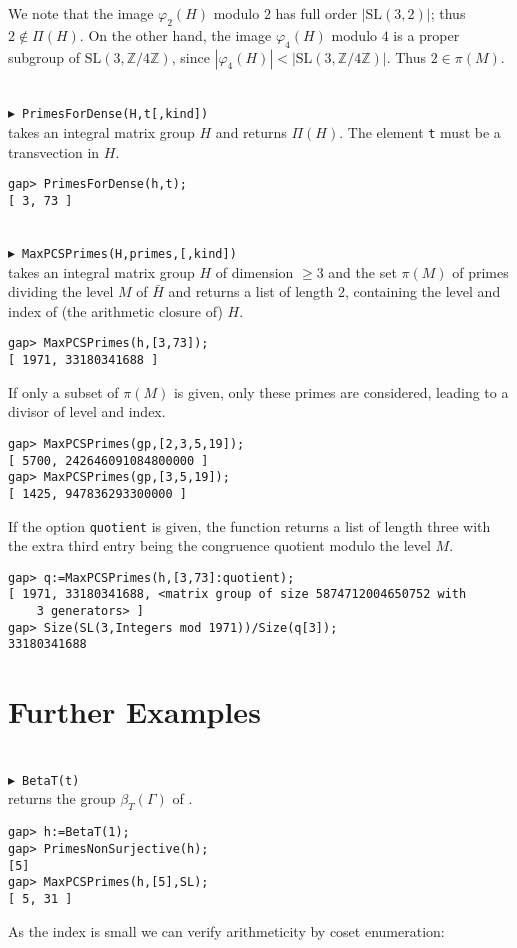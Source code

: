 \documentclass[a4paper,12pt]{amsart}
\newcommand{\Z}{\mathbb{Z}}
\newcommand{\SL}{\mathrm{SL}}
\def\mycmd#1{\ \smallskip\\$\blacktriangleright$\ #1\\}
\begin{document}
We note that the image $\varphi_2(H)$ modulo $2$ has full order
$|\SL(3,2)|$; thus $2\not\in\Pi(H)$.
On the other hand, the image $\varphi_4(H)$ modulo $4$ is a proper
subgroup of $\SL(3,\Z/4\Z)$, since $|\varphi_4(H)|<|\SL(3,\Z/4\Z)|$.
Thus $2\in\pi(M)$.


\mycmd{{\tt PrimesForDense(H,t[,kind])}}
takes an integral matrix group $H$ and returns $\Pi(H)$.
The element
{\tt t} must be a transvection in $H$.
\begin{verbatim}
gap> PrimesForDense(h,t);
[ 3, 73 ]
\end{verbatim}


\mycmd{{\tt MaxPCSPrimes(H,primes,[,kind])}}
takes an integral matrix group $H$ of dimension $\ge 3$ and the set $\pi(M)$ of primes dividing
the level $M$ of $\bar H$ and returns a list of length 2, containing the
level and index of (the arithmetic closure of) $H$.

\begin{verbatim}
gap> MaxPCSPrimes(h,[3,73]);
[ 1971, 33180341688 ]
\end{verbatim}

If only a subset of $\pi(M)$ is given, only these primes are considered,
leading to a divisor of level and index.

\begin{verbatim}
gap> MaxPCSPrimes(gp,[2,3,5,19]);
[ 5700, 242646091084800000 ]
gap> MaxPCSPrimes(gp,[3,5,19]);
[ 1425, 947836293300000 ]
\end{verbatim}

If the option {\tt quotient} is given, the function returns a list of length
three with the extra third entry being the congruence quotient modulo the level
$M$.

\begin{verbatim}
gap> q:=MaxPCSPrimes(h,[3,73]:quotient);
[ 1971, 33180341688, <matrix group of size 5874712004650752 with
    3 generators> ]
gap> Size(SL(3,Integers mod 1971))/Size(q[3]);
33180341688
\end{verbatim}

\section{Further Examples}

\mycmd{{\tt BetaT(t)}}
returns the group $\beta_T(\Gamma)$ of \cite{LongReidI}.
\begin{verbatim}
gap> h:=BetaT(1);
gap> PrimesNonSurjective(h);
[5]
gap> MaxPCSPrimes(h,[5],SL);
[ 5, 31 ]
\end{verbatim}
As the index is small we can verify arithmeticity by coset enumeration:
\end{document}
